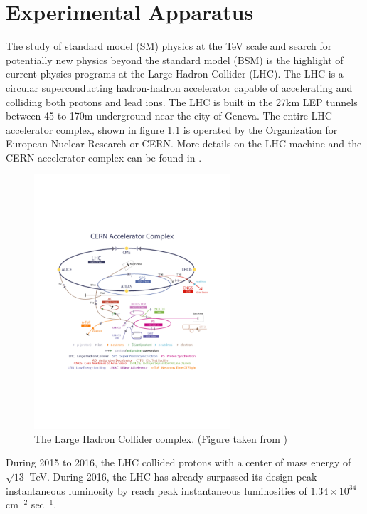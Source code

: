 \chapter{Experimental Apparatus}
\label{chap:Exp}

\indent The study of standard model (SM) physics at the TeV scale and search for potentially new physics beyond the standard model (BSM) is the highlight of current physics programs at the Large Hadron Collider (LHC).  The LHC is a circular superconducting hadron-hadron accelerator capable of accelerating and colliding both protons and lead ions.  The LHC is built in the 27km LEP tunnels between 45 to 170m underground near the city of Geneva.  The entire LHC accelerator complex, shown in figure \ref{LHC:fig:LHCComplex} is operated by the Organization for European Nuclear Research or CERN. More details on the LHC machine and the CERN accelerator complex can be found in \cite{LHC}. \\

\begin{figure}[h!]
\centering
\includegraphics[width=0.65\textwidth, angle=0]{figures/LHC_ATLAS/AccComplex0700829.pdf}
\caption{ The Large Hadron Collider complex. (Figure taken from \cite{LHC}) \label{LHC:fig:LHCComplex}}
\end{figure}

\indent During 2015 to 2016, the LHC collided protons with a center of mass energy of $\sqrt{13}$ TeV.  During 2016, the LHC has already surpassed its design peak instantaneous luminosity by reach peak instantaneous luminosities of $1.34 \times 10^{34}$ cm$^{-2}$ sec$^{-1}$.  \\

